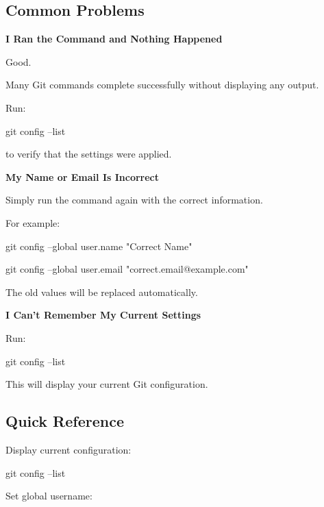 \documentclass{csc2059practical}
\begin{document}
\subsection{Common Problems}
\begin{commonerror}
\textbf{I Ran the Command and Nothing Happened}\par
\medskip

Good.


Many Git commands complete successfully without displaying any output.


Run:


\end{commonerror}
\begin{terminalplain}
git config --list
\end{terminalplain}
to verify that the settings were applied.

\begin{commonerror}
\textbf{My Name or Email Is Incorrect}\par
\medskip

Simply run the command again with the correct information.


For example:


\end{commonerror}
\begin{terminalplain}
git config --global user.name "Correct Name"
\end{terminalplain}
\begin{terminalplain}
git config --global user.email "correct.email@example.com"
\end{terminalplain}
The old values will be replaced automatically.

\begin{commonerror}
\textbf{I Can't Remember My Current Settings}\par
\medskip

Run:


\end{commonerror}
\begin{terminalplain}
git config --list
\end{terminalplain}
This will display your current Git configuration.

\subsection{Quick Reference}
Display current configuration:

\begin{terminalplain}
git config --list
\end{terminalplain}
Set global username:
\end{document}
